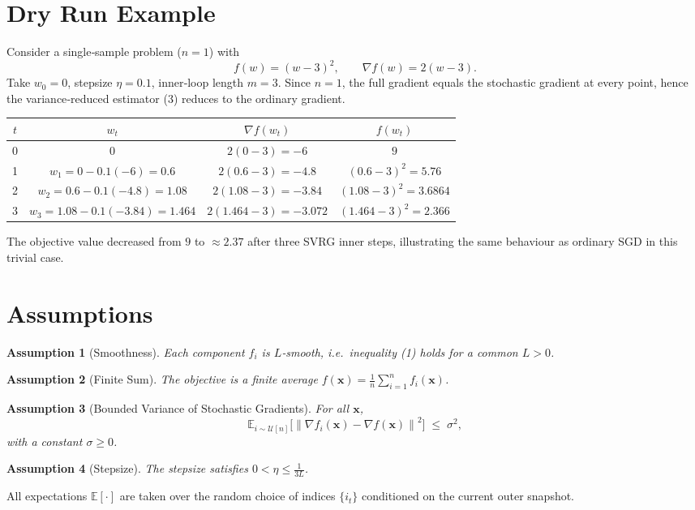 \documentclass{article}
\newtheorem{assumption}{Assumption}[section]
\newcommand{\EE}{\mathbb{E}}
\newcommand{\norm}[1]{\left\|#1\right\|}
\newcommand{\grad}{\nabla}
\begin{document}
\section*{Dry Run Example}
Consider a single‑sample problem ($n=1$) with
\[
f(w)=(w-3)^{2},\qquad \grad f(w)=2(w-3).
\]
Take $w_{0}=0$, stepsize $\eta=0.1$, inner‑loop length $m=3$.
Since $n=1$, the full gradient equals the stochastic gradient at every point,
hence the variance‑reduced estimator (3) reduces to the ordinary gradient.

\begin{center}
\begin{tabular}{c|c|c|c}
$t$ & $w_{t}$ & $\grad f(w_{t})$ & $f(w_{t})$ \\ \hline
0 & $0$ & $2(0-3)=-6$ & $9$ \\ 
1 & $w_{1}=0-0.1(-6)=0.6$ & $2(0.6-3)=-4.8$ & $(0.6-3)^{2}=5.76$ \\ 
2 & $w_{2}=0.6-0.1(-4.8)=1.08$ & $2(1.08-3)=-3.84$ & $(1.08-3)^{2}=3.6864$ \\ 
3 & $w_{3}=1.08-0.1(-3.84)=1.464$ & $2(1.464-3)=-3.072$ & $(1.464-3)^{2}=2.366$ 
\end{tabular}
\end{center}
The objective value decreased from $9$ to $\approx2.37$ after three SVRG inner steps,
illustrating the same behaviour as ordinary SGD in this trivial case.

\newpage
\section*{Assumptions}
\begin{assumption}[Smoothness]\label{ass:smooth}
Each component $f_i$ is $L$‑smooth, i.e.\ inequality (1) holds for a common $L>0$.
\end{assumption}
\begin{assumption}[Finite Sum]\label{ass:finite}
The objective is a finite average $f(\mathbf{x})=\frac1n\sum_{i=1}^{n}f_i(\mathbf{x})$.
\end{assumption}
\begin{assumption}[Bounded Variance of Stochastic Gradients]\label{ass:var}
For all $\mathbf{x}$,
\[
\EE_{i\sim\mathcal{U}[n]}\!\big[\norm{\grad f_i(\mathbf{x})-\grad f(\mathbf{x})}^{2}\big]
\;\le\;\sigma^{2},
\]
with a constant $\sigma\ge0$.
\end{assumption}
\begin{assumption}[Stepsize]\label{ass:stepsize}
The stepsize satisfies $0<\eta\le\frac{1}{3L}$.
\end{assumption}
All expectations $\EE[\cdot]$ are taken over the random choice of indices
$\{i_t\}$ conditioned on the current outer snapshot.
\end{document}

